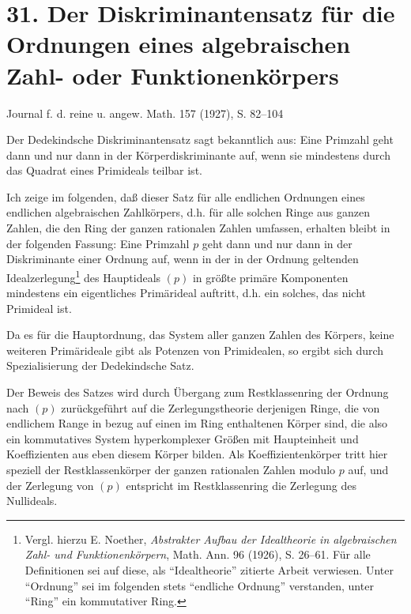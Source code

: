 \documentclass[11pt]{article}
\begin{document}
\section*{31. Der Diskriminantensatz für die Ordnungen eines algebraischen Zahl- oder Funktionenkörpers}
\begin{center}
Journal f. d. reine u. angew. Math. 157 (1927), S. 82--104
\end{center}

Der Dedekindsche Diskriminantensatz sagt bekanntlich aus: Eine Primzahl geht dann und nur dann in der Körperdiskriminante auf, wenn sie mindestens durch das Quadrat eines Primideals teilbar ist.

Ich zeige im folgenden, daß dieser Satz für alle endlichen Ordnungen eines endlichen algebraischen Zahlkörpers, d.h. für alle solchen Ringe aus ganzen Zahlen, die den Ring der ganzen rationalen Zahlen umfassen, erhalten bleibt in der folgenden Fassung: Eine Primzahl $p$ geht dann und nur dann in der Diskriminante einer Ordnung auf, wenn in der in der Ordnung geltenden Idealzerlegung\footnote{Vergl. hierzu E. Noether, \emph{Abstrakter Aufbau der Idealtheorie in algebraischen Zahl- und Funktionenkörpern}, Math. Ann. 96 (1926), S. 26--61. Für alle Definitionen sei auf diese, als ``Idealtheorie'' zitierte Arbeit verwiesen. Unter ``Ordnung'' sei im folgenden stets ``endliche Ordnung'' verstanden, unter ``Ring'' ein kommutativer Ring.} des Hauptideals $(p)$ in größte primäre Komponenten mindestens ein eigentliches Primärideal auftritt, d.h. ein solches, das nicht Primideal ist.

Da es für die Hauptordnung, das System aller ganzen Zahlen des Körpers, keine weiteren Primärideale gibt als Potenzen von Primidealen, so ergibt sich durch Spezialisierung der Dedekindsche Satz.

Der Beweis des Satzes wird durch Übergang zum Restklassenring der Ordnung nach $(p)$ zurückgeführt auf die Zerlegungstheorie derjenigen Ringe, die von endlichem Range in bezug auf einen im Ring enthaltenen Körper sind, die also ein kommutatives System hyperkomplexer Größen mit Haupteinheit und Koeffizienten aus eben diesem Körper bilden. Als Koeffizientenkörper tritt hier speziell der Restklassenkörper der ganzen rationalen Zahlen modulo $p$ auf, und der Zerlegung von $(p)$ entspricht im Restklassenring die Zerlegung des Nullideals.
\end{document}
